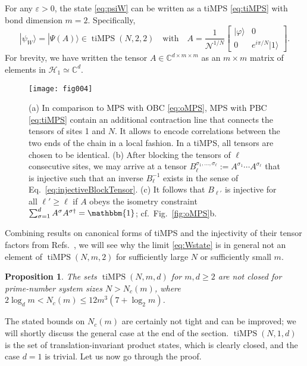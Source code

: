 \documentclass[english,11pt,aps,pra,onecolumn,tightenlines,groupedaddress,superscriptaddress,notitlepage,floatfix,fleqn]{revtex4-1}
\newcommand{\id}{\mathbbm{1}}
\newcommand{\ket}{\rangle}
\newcommand{\s}{\sigma}
\newcommand{\CC}{\mathbb{C}}
\newcommand{\mc}[1]{\mathcal{#1}}
\renewcommand{\H}{\mc{H}}
\newcommand{\tiMPS}{\operatorname{tiMPS}}
\newcommand{\veps}{\varepsilon}
\newcommand{\vphi}{\varphi}
\renewcommand{\Bmatrix}[1]{\begin{bmatrix}#1\end{bmatrix}}
\newtheorem{prop}{Proposition}
\begin{document}
For any $\veps>0$, the state \eqref{eq:psiW} can be written as a tiMPS \eqref{eq:tiMPS} with bond dimension $m=2$. Specifically,
\begin{equation}\label{eq:psiWA}
	|\psi_W\ket=|\Psi(A)\ket\in\tiMPS(N,2,2)\quad\text{with}\quad
	A=\frac{1}{\mc{N}^{1/N}}\Bmatrix{|\vphi\ket&0\\ 0&e^{i\pi/N}|1\ket}.
\end{equation}
For brevity, we have written the tensor $A\in\CC^{d\times m\times m}$ as an $m\times m$ matrix of elements in $\H_1\simeq \CC^d$.
\begin{figure*}[t]
\label{fig:tiMPS}
\texttt{[image: fig004]}
\caption{(a) In comparison to MPS with OBC \eqref{eq:oMPS}, MPS with PBC \eqref{eq:tiMPS} contain an additional contraction line that connects the tensors of sites 1 and $N$. It allows to encode correlations between the two ends of the chain in a local fashion. In a tiMPS, all tensors are chosen to be identical. (b) After blocking the tensors of $\ell$ consecutive sites, we may arrive at a tensor $B_\ell^{\s_1,\dotsc,\s_\ell}:=A^{\s_1}\dotsb A^{\s_\ell}$ that is injective such that an inverse $B^{-1}_\ell$ exists in the sense of Eq.~\eqref{eq:injectiveBlockTensor}. (c) It follows that $B_{\ell'}$ is injective for all $\ell'\geq\ell$ if $A$ obeys the isometry constraint $\sum_{\s=1}^d A^\s A^{\s\dag}=\id$; cf.~Fig.~\ref{fig:oMPS}b.}
\end{figure*}

Combining results on canonical forms of tiMPS and the injectivity of their tensor factors from Refs.~\cite{Fannes1992-144,PerezGarcia2007-7,Sanz2010-56,Michalek2019-65}, we will see why the limit \eqref{eq:Wstate} is in general not an element of $\tiMPS(N,m,2)$ for sufficiently large $N$ or sufficiently small $m$.
\begin{prop}\label{prop:tiMPS}
The sets $\tiMPS(N,m,d)$ for $m,d\geq 2$ are not closed for prime-number system sizes $N>N_c(m)$, where $2\log_d m< N_c(m)\leq 12 m^3(7+\log_2 m)$.
\end{prop}
The stated bounds on $N_c(m)$ are certainly not tight and can be improved; we will shortly discuss the general case at the end of the section. $\tiMPS(N,1,d)$ is the set of translation-invariant product states, which is clearly closed, and the case $d=1$ is trivial. Let us now go through the proof.
\end{document}
